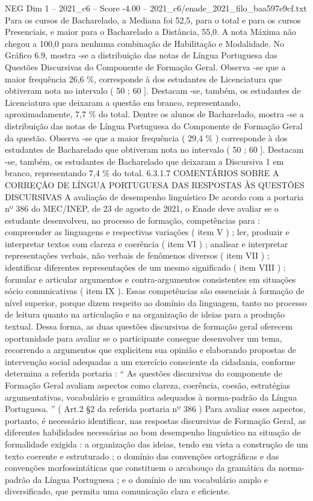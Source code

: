 \begin{textsample}{NEG Dim 1 – 2021\_c6 – Score -4.00 – 2021\_c6/enade\_2021\_filo\_baa597e9cf.txt}
Para os cursos de Bacharelado, a Mediana foi 52,5, para o total e para os cursos Presenciais, e maior para o Bacharelado a Distância, 55,0.
A nota Máxima não chegou a 100,0 para nenhuma combinação de Habilitação e Modalidade.
No Gráfico 6.9, mostra -se a distribuição das notas de Língua Portuguesa das Questões Discursivas do Componente de Formação Geral.
Observa -se que a maior frequência 26,6 \%, corresponde à dos estudantes de Licenciatura que obtiveram nota no intervalo ( 50 ; 60 ].
Destacam -se, também, os estudantes de Licenciatura que deixaram a questão em branco, representando, aproximadamente, 7,7 \% do total.
Dentre os alunos de Bacharelado, mostra -se a distribuição das notas de Língua Portuguesa do Componente de Formação Geral da questão.
Observa -se que a maior frequência ( 29,4 \% ) corresponde à dos estudantes de Bacharelado que obtiveram nota no intervalo ( 50 ; 60 ].
Destacam -se, também, os estudantes de Bacharelado que deixaram a Discursiva 1 em branco, representando 7,4 \% do total. 6.3.1.7 COMENTÁRIOS SOBRE A CORREÇÃO DE LÍNGUA PORTUGUESA DAS RESPOSTAS ÀS QUESTÕES DISCURSIVAS A avaliação de desempenho linguístico De acordo com a portaria nº 386 do MEC/INEP, de 23 de agosto de 2021, o Enade deve avaliar se o estudante desenvolveu, no processo de formação, competências para : compreender as linguagens e respectivas variações ( item V ) ; ler, produzir e interpretar textos com clareza e coerência ( item VI ) ; analisar e interpretar representações verbais, não verbais de fenômenos diversos ( item VII ) ; identificar diferentes representações de um mesmo significado ( item VIII ) ; formular e articular argumentos e contra-argumentos consistentes em situações sócio comunicativas ( item IX ).
Essas competências são essenciais à formação de nível superior, porque dizem respeito ao domínio da linguagem, tanto no processo de leitura quanto na articulação e na organização de ideias para a produção textual.
Dessa forma, as duas questões discursivas de formação geral oferecem oportunidade para avaliar se o participante consegue desenvolver um tema, recorrendo a argumentos que explicitem sua opinião e elaborando propostas de intervenção social adequadas a um exercício consciente da cidadania, conforme determina a referida portaria : “ As questões discursivas do componente de Formação Geral avaliam aspectos como clareza, coerência, coesão, estratégias argumentativas, vocabulário e gramática adequados à norma-padrão da Língua Portuguesa. ” ( Art.2 §2 da referida portaria nº 386 ) Para avaliar esses aspectos, portanto, é necessário identificar, nas respostas discursivas de Formação Geral, as diferentes habilidades necessárias ao bom desempenho linguístico na situação de formalidade exigida : a organização das ideias, tendo em vista a construção de um texto coerente e estruturado ; o domínio das convenções ortográficas e das convenções morfossintáticas que constituem o arcabouço da gramática da norma-padrão da Língua Portuguesa ; e o domínio de um vocabulário amplo e diversificado, que permita uma comunicação clara e eficiente.

\end{textsample}
